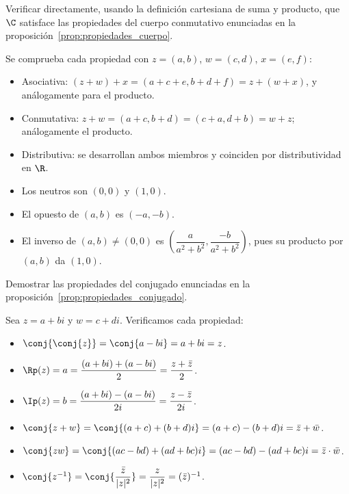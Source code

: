 
\begin{questions}
  \question \label{ejer:propiedades_cuerpo}
  Verificar directamente, usando la definición cartesiana de suma y producto, que $\C$ satisface las propiedades del cuerpo conmutativo enunciadas en la proposición~\ref{prop:propiedades_cuerpo}.

  \begin{solution}
    Se comprueba cada propiedad con $z=(a,b)$, $w=(c,d)$, $x=(e,f)$:
    \begin{itemize}
      \item {} Asociativa: $(z+w)+x = (a+c+e,b+d+f) = z+(w+x)$, y análogamente para el producto.
      \item {} Conmutativa: $z+w=(a+c,b+d)=(c+a,d+b)=w+z$; análogamente el producto.
      \item {} Distributiva: se desarrollan ambos miembros y coinciden por distributividad en $\R$.
      \item {} Los neutros son $(0,0)$ y $(1,0)$.
      \item {} El opuesto de $(a,b)$ es $(-a,-b)$.
      \item {} El inverso de $(a,b)\neq(0,0)$ es $\left(\dfrac{a}{a^2+b^2},\dfrac{-b}{a^2+b^2}\right)$, pues su producto por $(a,b)$ da $(1,0)$.
    \end{itemize}
  \end{solution}

  \question \label{ejer:propiedades_conjugado}
  Demostrar las propiedades del conjugado enunciadas en la proposición~\ref{prop:propiedades_conjugado}.

  \begin{solution}
    Sea $z=a+bi$ y $w=c+di$. Verificamos cada propiedad:
    \begin{itemize}
      \item $\conj{\conj{z}} = \conj{a-bi} = a+bi = z$.
      \item $\Rp(z) = a = \dfrac{(a+bi)+(a-bi)}{2} = \dfrac{z+\bar{z}}{2}$.
      \item $\Ip(z) = b = \dfrac{(a+bi)-(a-bi)}{2i} = \dfrac{z-\bar{z}}{2i}$.
      \item $\conj{z+w} = \conj{(a+c)+(b+d)i} = (a+c)-(b+d)i = \bar{z}+\bar{w}$.
      \item $\conj{zw} = \conj{(ac-bd)+(ad+bc)i} = (ac-bd)-(ad+bc)i = \bar{z}\cdot\bar{w}$.
      \item $\conj{z^{-1}} = \conj{\dfrac{\bar{z}}{|z|^2}} = \dfrac{z}{|z|^2} = (\bar{z})^{-1}$.
    \end{itemize}
  \end{solution}


\end{questions}
